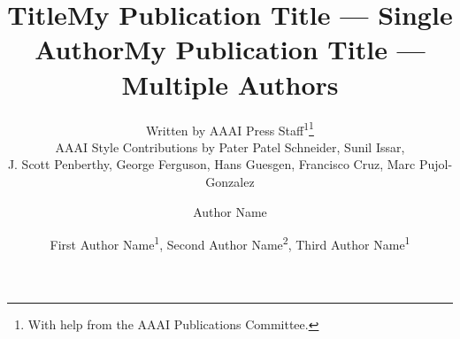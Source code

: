\documentclass[letterpaper]{article} %
\title{Title}
\author{
    Written by AAAI Press Staff\textsuperscript{\rm 1}\thanks{With help from the AAAI Publications Committee.}\\
    AAAI Style Contributions by Pater Patel Schneider,
    Sunil Issar,\\
    J. Scott Penberthy,
    George Ferguson,
    Hans Guesgen,
    Francisco Cruz\equalcontrib,
    Marc Pujol-Gonzalez\equalcontrib
}
\title{My Publication Title --- Single Author}
\author {
    Author Name
}
\title{My Publication Title --- Multiple Authors}
\author {
    First Author Name\textsuperscript{\rm 1},
    Second Author Name\textsuperscript{\rm 2},
    Third Author Name\textsuperscript{\rm 1}
}
\begin{document}
\maketitle

\begin{abstract}
\end{abstract}
\end{document}

